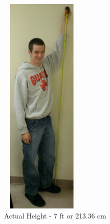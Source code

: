 \documentclass[pdftex,10.5pt]{report}
\begin{document}
\begin{figure}[H]
	\centering
	\begin{subfigure}[H]{0.4\textwidth}
		\includegraphics[height=108mm, width=40mm]{figures/ryanmeasure}
		\caption{Actual Height - 7 ft or 213.36 cm}
	\end{subfigure}
	\begin{subfigure}[H]{0.4\textwidth}

\end{subfigure}
\end{figure}
\end{document}
